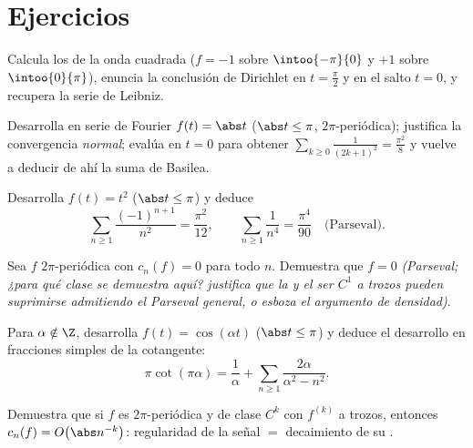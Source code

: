 \section{Ejercicios}

\begin{exercise}[$\star$]\label{exo:b2:fourier:1}
Calcula los  de la onda cuadrada ($f = -1$
sobre $\intoo{-\pi}{0}$ y $+1$ sobre $\intoo{0}{\pi}$), enuncia la
conclusión de Dirichlet en $t = \frac\pi2$ y en el salto $t = 0$, y
recupera la serie de Leibniz.
\end{exercise}

\begin{exercise}[$\star$]\label{exo:b2:fourier:2}
Desarrolla en serie de Fourier $f(t) = \abs t$ ($\abs t \leq \pi$,
$2\pi$-periódica); justifica la convergencia \emph{normal}; evalúa en
$t = 0$ para obtener $\sum_{k\geq0}\frac{1}{(2k+1)^2} =
\frac{\pi^2}{8}$ y vuelve a deducir de ahí la suma de Basilea.
\end{exercise}

\begin{exercise}[$\star$]\label{exo:b2:fourier:3}
Desarrolla $f(t) = t^2$ ($\abs t \leq \pi$) y deduce
\[
\sum_{n\geq1}\frac{(-1)^{n+1}}{n^2} = \frac{\pi^2}{12},
\qquad
\sum_{n\geq1}\frac{1}{n^4} = \frac{\pi^4}{90}
\quad\text{(Parseval)}.
\]
\end{exercise}

\begin{exercise}[$\star\star$]\label{exo:b2:fourier:4}
Sea $f$  $2\pi$-periódica con $c_n(f) = 0$ para todo $n$.
Demuestra que $f = 0$ \emph{(Parseval; ¿para qué clase se demuestra
aquí? justifica que la  y el ser $C^1$ a trozos pueden
suprimirse admitiendo el Parseval general, o esboza el argumento de
densidad)}.
\end{exercise}

\begin{exercise}[$\star\star$]\label{exo:b2:fourier:5}
Para $\alpha \notin \Z$, desarrolla $f(t) = \cos(\alpha t)$ ($\abs t
\leq \pi$) y deduce el desarrollo en fracciones simples de la
cotangente:
\[
\pi\cot(\pi\alpha) = \frac{1}{\alpha} + \sum_{n\geq1}
\frac{2\alpha}{\alpha^2 - n^2} .
\]
\end{exercise}

\begin{exercise}[$\star\star$]\label{exo:b2:fourier:6}
Demuestra que si $f$ es $2\pi$-periódica y de clase $C^k$ con
$f^{(k)}$  a trozos, entonces $c_n(f) = O\bigl(\abs
n^{-k}\bigr)$: regularidad de la señal $=$ decaimiento de su
.
\end{exercise}

